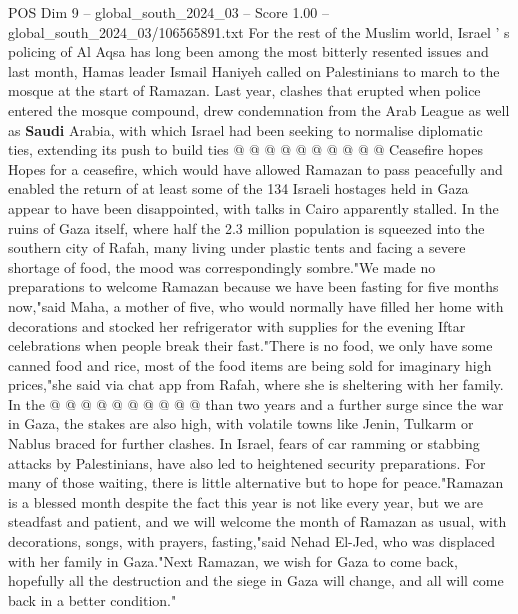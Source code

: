 \begin{textsample}{POS Dim 9 – global\_south\_2024\_03 – Score 1.00 – global\_south\_2024\_03/106565891.txt}
For the rest of the Muslim world, Israel ' s policing of Al Aqsa has long been among the most bitterly resented issues and last month, Hamas leader Ismail Haniyeh called on Palestinians to march to the mosque at the start of Ramazan.
Last year, clashes that erupted when police entered the mosque compound, drew condemnation from the Arab League as well as \textbf{Saudi} Arabia, with which Israel had been seeking to normalise diplomatic ties, extending its push to build ties @ @ @ @ @ @ @ @ @ @ Ceasefire hopes Hopes for a ceasefire, which would have allowed Ramazan to pass peacefully and enabled the return of at least some of the 134 Israeli hostages held in Gaza appear to have been disappointed, with talks in Cairo apparently stalled.
In the ruins of Gaza itself, where half the 2.3 million population is squeezed into the southern city of Rafah, many living under plastic tents and facing a severe shortage of food, the mood was correspondingly sombre."We made no preparations to welcome Ramazan because we have been fasting for five months now,"said Maha, a mother of five, who would normally have filled her home with decorations and stocked her refrigerator with supplies for the evening Iftar celebrations when people break their fast."There is no food, we only have some canned food and rice, most of the food items are being sold for imaginary high prices,"she said via chat app from Rafah, where she is sheltering with her family.
In the @ @ @ @ @ @ @ @ @ @ than two years and a further surge since the war in Gaza, the stakes are also high, with volatile towns like Jenin, Tulkarm or Nablus braced for further clashes.
In Israel, fears of car ramming or stabbing attacks by Palestinians, have also led to heightened security preparations.
For many of those waiting, there is little alternative but to hope for peace."Ramazan is a blessed month despite the fact this year is not like every year, but we are steadfast and patient, and we will welcome the month of Ramazan as usual, with decorations, songs, with prayers, fasting,"said Nehad El-Jed, who was displaced with her family in Gaza."Next Ramazan, we wish for Gaza to come back, hopefully all the destruction and the siege in Gaza will change, and all will come back in a better condition."

\end{textsample}
